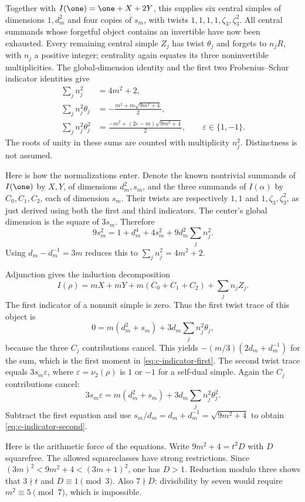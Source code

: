 Together with $I(\one)=\one+X+2Y$, this supplies six central
simples of dimensions $1,d_m^2$ and four copies of $s_m$, with
twists $1,1,1,1,\zeta_3,\zeta_3^2$. All central summands whose
forgetful object contains an invertible have now been exhausted.
Every remaining central simple $Z_j$ has twist $\theta_j$ and forgets
to $n_jR$, with $n_j$ a positive integer; centrality again equates its
three
noninvertible multiplicities.
The global-dimension identity and the first two Frobenius--Schur
indicator identities give
\begin{align}
 \sum_jn_j^2&=4m^2+2,\label{eq:c-indicator-count}\\
 \sum_jn_j^2\theta_j&=-\frac{m^2+m\sqrt{9m^2+4}}2,
 \label{eq:c-indicator-first}\\
 \sum_jn_j^2\theta_j^2&=\frac{-m^2+(2\varepsilon-m)
                            \sqrt{9m^2+4}}2,
 \qquad\varepsilon\in\{1,-1\}.
 \label{eq:c-indicator-second}
\end{align}
The roots of unity in these sums are counted with multiplicity
$n_j^2$. Distinctness is not assumed.

Here is how the normalizations enter. Denote the known nontrivial
summands of $I(\one)$ by $X,Y$, of dimensions $d_m^2,s_m$, and
the three summands of $I(\alpha)$ by $C_0,C_1,C_2$, each of
dimension $s_m$. Their twists are respectively $1,1$ and
$1,\zeta_3,\zeta_3^2$, as just derived using both the first and third
indicators. The center's global dimension is the square
of $3s_m$. Therefore
\[
 9s_m^2=1+d_m^4+4s_m^2+9d_m^2\sum_jn_j^2.
\]
Using $d_m-d_m^{-1}=3m$ reduces this to
$\sum_jn_j^2=4m^2+2$.

Adjunction gives the induction decomposition
\[
 I(\rho)=mX+mY+m(C_0+C_1+C_2)+\sum_jn_jZ_j.
\]
The first indicator of a nonunit simple is zero. Thus the first
twist trace of this object is
\[
 0=m(d_m^2+s_m)+3d_m\sum_jn_j^2\theta_j,
\]
because the three $C_j$ contributions cancel. This yields
$-(m/3)(2d_m+d_m^{-1})$ for the sum, which is the first moment
in \eqref{eq:c-indicator-first}. The second twist trace equals
$3s_m\varepsilon$, where $\varepsilon=\nu_2(\rho)$ is $1$ or
$-1$ for a self-dual simple. Again the $C_j$ contributions cancel:
\[
 3s_m\varepsilon
   =m(d_m^2+s_m)+3d_m\sum_jn_j^2\theta_j^2.
\]
Subtract the first equation and use
$s_m/d_m=d_m+d_m^{-1}=\sqrt{9m^2+4}$ to obtain
\eqref{eq:c-indicator-second}.

Here is the arithmetic force of the equations. Write
$9m^2+4=t^2D$ with $D$ squarefree. The allowed squareclasses have
strong restrictions. Since
$(3m)^2<9m^2+4<(3m+1)^2$, one has $D>1$.
Reduction modulo three shows that $3\nmid t$ and $D\equiv1\pmod3$.
Also $7\nmid D$: divisibility by seven would require
$m^2\equiv5\pmod7$, which is impossible.

